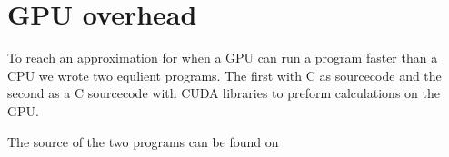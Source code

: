 \chapter{GPU overhead}
\label{app:gpuoverhead}
To reach an approximation for when a GPU can run a program faster than a CPU  we wrote two equlient programs.
The first with C as sourcecode and the second as a C sourcecode with CUDA libraries to preform calculations on the GPU.

The source of the two programs can be found on 
